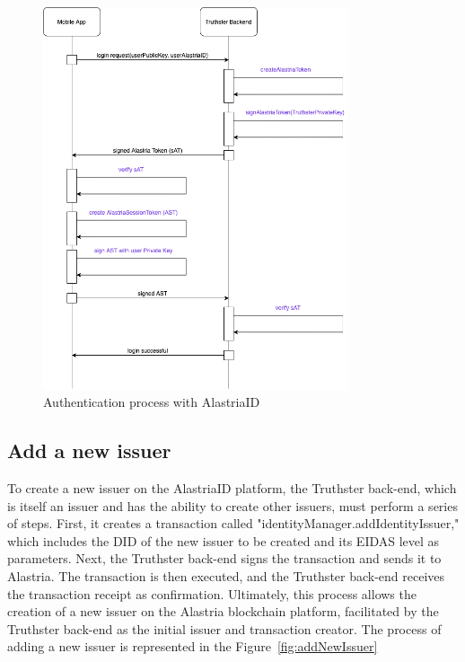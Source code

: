 \documentclass[target=mst,aauheader=]{thud}
\begin{document}
\begin{figure}
    \centering
    \includegraphics[width=0.8\textwidth]{images/authenticationAlastriaID.png}
    \caption{Authentication process with AlastriaID}
    \label{fig:authentication}
\end{figure}


\subsection{Add a new issuer}

To create a new issuer on the AlastriaID platform, the Truthster back-end, which is itself an issuer and has the ability to create other issuers, must perform a series of steps. First, it creates a transaction called "identityManager.addIdentityIssuer," which includes the DID of the new issuer to be created and its EIDAS level as parameters. Next, the Truthster back-end signs the transaction and sends it to Alastria. The transaction is then executed, and the Truthster back-end receives the transaction receipt as confirmation. Ultimately, this process allows the creation of a new issuer on the Alastria blockchain platform, facilitated by the Truthster back-end as the initial issuer and transaction creator.
The process of adding a new issuer is represented in the Figure~\ref{fig:addNewIssuer}
\end{document}
